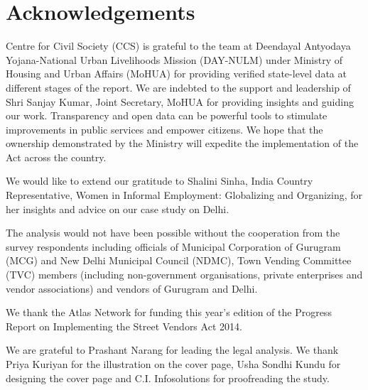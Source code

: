 \documentclass[a4paper, 12pt, twoside]{article}
\begin{document}


\pagestyle{empty} %
\pagestyle{fancy} %
\setcounter{page}{1} %


\section*{Acknowledgements}
Centre for Civil Society (CCS) is grateful to the team at Deendayal Antyodaya Yojana-National Urban Livelihoods Mission (DAY-NULM) under Ministry of Housing and Urban Affairs (MoHUA) for providing verified state-level data at different stages of the report. We are indebted to the support and leadership of Shri Sanjay Kumar, Joint Secretary, MoHUA for providing insights and guiding our work. Transparency and open data can be powerful tools to stimulate improvements in public services and empower citizens. We hope that the ownership demonstrated by the Ministry will expedite the implementation of the Act across the country.

We would like to extend our gratitude to Shalini Sinha, India Country Representative, Women in Informal Employment: Globalizing and Organizing, for her insights and advice on our case study on Delhi.

The analysis would not have been possible without the cooperation from the survey respondents including officials of Municipal Corporation of Gurugram (MCG) and New Delhi Municipal Council (NDMC), Town Vending Committee (TVC) members (including non-government organisations, private enterprises and vendor associations) and vendors of Gurugram and Delhi.

We thank the Atlas Network for funding this year’s edition of the Progress Report on Implementing the Street Vendors Act 2014.

We are grateful to Prashant Narang for leading the legal analysis. We thank Priya Kuriyan for the illustration on the cover page, Usha Sondhi Kundu for designing the cover page and C.I. Infosolutions for proofreading the study. 
\end{document}
